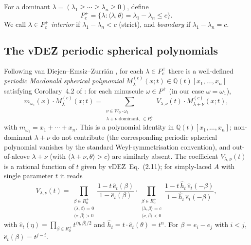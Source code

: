 \documentclass[11pt]{article}
\theoremstyle{definition}
\newcommand{\Pcp}{P_c^+}
\newcommand{\Rplus}{R_0^+}
\newcommand{\Q}{\mathbb{Q}}
\newcommand{\ip}[2]{\langle #1, #2 \rangle}
\newcommand{\eh}{\hat{e}_t}
\begin{document}
For a dominant $\lambda = (\lambda_1 \ge \cdots \ge \lambda_n \ge 0)$, define
\[
\Pcp = \{\lambda : \ip{\lambda}{\theta} = \lambda_1 - \lambda_n \le c\}.
\]
We call $\lambda \in \Pcp$ \emph{interior} if $\lambda_1 - \lambda_n < c$
(strict), and \emph{boundary} if $\lambda_1 - \lambda_n = c$.

\subsection{The vDEZ periodic spherical polynomials}
Following van Diejen--Emsiz--Zurri\'an \cite{vDEZ2021}, for each
$\lambda \in \Pcp$ there is a well-defined \emph{periodic Macdonald spherical
polynomial} $M^{(c)}_\lambda(x;t) \in \Q(t)[x_1,\ldots,x_n]$ satisfying
Corollary~4.2 of \cite{vDEZ2021}: for each
minuscule $\omega \in P^+$ (in our case $\omega = \omega_1$),
\begin{equation}
m_{\omega_1}(x) \cdot M^{(c)}_\lambda(x;t)
= \sum_{\substack{\nu \in W_0\cdot\omega_1 \\ \lambda+\nu\text{ dominant, }\in \Pcp}}
V_{\lambda,\nu}(t) \cdot M^{(c)}_{\lambda + \nu}(x;t),
\label{eq:vdez-pieri}
\end{equation}
with $m_{\omega_1} = x_1 + \cdots + x_n$. This is a polynomial identity in
$\Q(t)[x_1,\ldots,x_n]$; non-dominant $\lambda + \nu$ do not contribute
(the corresponding periodic spherical polynomial vanishes by the standard
Weyl-symmetrisation convention), and out-of-alcove $\lambda + \nu$
(with $\ip{\lambda+\nu}{\theta} > c$) are similarly absent. The
coefficient $V_{\lambda,\nu}(t)$ is a rational function of $t$ given by
vDEZ~Eq.~(2.11); for simply-laced $A$ with single parameter $t$ it reads
\begin{equation}
V_{\lambda,\nu}(t) = \prod_{\substack{\beta \in \Rplus \\ \ip{\lambda}{\beta}=0 \\ \ip{\nu}{\beta}>0}} \frac{1 - t\,\eh(\beta)}{1 - \eh(\beta)}
\cdot
\prod_{\substack{\beta \in \Rplus \\ \ip{\lambda}{\beta}=c \\ \ip{\nu}{\beta}<0}} \frac{1 - t\,\hat h_t\,\eh(-\beta)}{1 - \hat h_t\,\eh(-\beta)},
\label{eq:vdez-V}
\end{equation}
with $\eh(\eta) = \prod_{\beta \in \Rplus} t^{\ip{\eta}{\beta}/2}$
and $\hat h_t = t \cdot \eh(\theta) = t^n$. For $\beta = e_i - e_j$
with $i < j$, $\eh(\beta) = t^{j-i}$.
\end{document}
